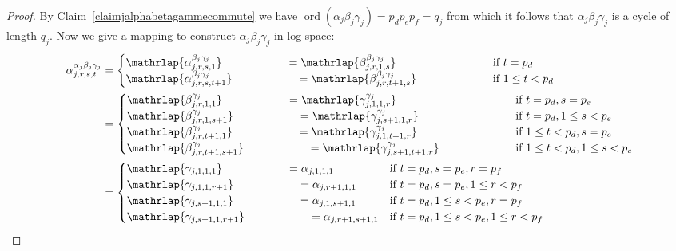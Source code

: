 \documentclass{article}
\DeclareMathOperator{\ord}{ord}
\begin{document}
\begin{proof}
By Claim~\ref{claimjalphabetagammecommute} we have $\ord(\alpha_j\beta_j\gamma_j) = p_dp_ep_f = q_j$ from which it follows that $\alpha_j\beta_j\gamma_j$ is a cycle of length $q_j$. Now we give a mapping to construct $\alpha_j\beta_j\gamma_j$ in log-space:
\begin{align*}
\alpha_{j,r,s,t}^{\alpha_j\beta_j\gamma_j}&= \begin{cases}
\mathrlap{\alpha_{j,r,s,1}^{\beta_j\gamma_j}}\hphantom{\gamma_{j,s+1,t+1,r+1}} = \mathrlap{\beta_{j,r,1,s}^{\beta_j\gamma_j}}\hphantom{\alpha_{j,r+1,s+1,t+1}} & \text{if } t=p_d\\
\mathrlap{\alpha_{j,r,s,t+1}^{\beta_j\gamma_j}}\hphantom{\gamma_{j,s+1,t+1,r+1}} = \mathrlap{\beta_{j,r,t+1,s}^{\beta_j\gamma_j}}\hphantom{\alpha_{j,r+1,s+1,t+1}} & \text{if } 1 \leq t < p_d
\end{cases}\\
&= \begin{cases}
\mathrlap{\beta_{j,r,1,1}^{\gamma_j}}\hphantom{\gamma_{j,s+1,t+1,r+1}} = \mathrlap{\gamma_{j,1,1,r}^{\gamma_j}}\hphantom{\alpha_{j,r+1,s+1,t+1}} & \text{if } t=p_d, s=p_e\\
\mathrlap{\beta_{j,r,1,s+1}^{\gamma_j}}\hphantom{\gamma_{j,s+1,t+1,r+1}} = \mathrlap{\gamma_{j,s+1,1,r}^{\gamma_j}}\hphantom{\alpha_{j,r+1,s+1,t+1}} & \text{if } t=p_d, 1 \leq s < p_e\\
\mathrlap{\beta_{j,r,t+1,1}^{\gamma_j}}\hphantom{\gamma_{j,s+1,t+1,r+1}} = \mathrlap{\gamma_{j,1,t+1,r}^{\gamma_j}}\hphantom{\alpha_{j,r+1,s+1,t+1}} & \text{if } 1 \leq t < p_d, s=p_e\\
\mathrlap{\beta_{j,r,t+1,s+1}^{\gamma_j}}\hphantom{\gamma_{j,s+1,t+1,r+1}} = \mathrlap{\gamma_{j,s+1,t+1,r}^{\gamma_j}}\hphantom{\alpha_{j,r+1,s+1,t+1}} & \text{if } 1 \leq t < p_d, 1 \leq s < p_e
\end{cases}\\
&= \begin{cases}
\mathrlap{\gamma_{j,1,1,1}}\hphantom{\gamma_{j,s+1,t+1,r+1}} = \alpha_{j,1,1,1} & \text{if } t=p_d, s=p_e, r=p_f\\
\mathrlap{\gamma_{j,1,1,r+1}}\hphantom{\gamma_{j,s+1,t+1,r+1}} = \alpha_{j,r+1,1,1} & \text{if } t=p_d, s=p_e, 1 \leq r < p_f\\
\mathrlap{\gamma_{j,s+1,1,1}}\hphantom{\gamma_{j,s+1,t+1,r+1}} = \alpha_{j,1,s+1,1} & \text{if } t=p_d, 1 \leq s < p_e, r=p_f\\
\mathrlap{\gamma_{j,s+1,1,r+1}}\hphantom{\gamma_{j,s+1,t+1,r+1}} = \alpha_{j,r+1,s+1,1} & \text{if } t=p_d, 1 \leq s < p_e, 1 \leq r < p_f\\

\end{cases}
\end{align*}
\end{proof}
\end{document}

